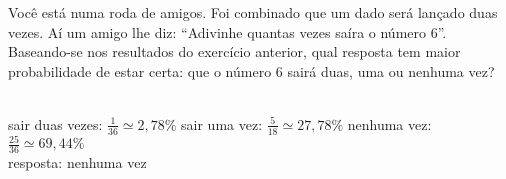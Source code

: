 \begin{ex}
Você está numa roda de amigos. Foi combinado que um dado será lançado duas vezes. Aí um amigo lhe diz: “Adivinhe quantas vezes saíra o número 6”.  Baseando-se nos resultados do exercício anterior, qual resposta tem maior probabilidade de estar certa: que o número 6 sairá duas, uma ou nenhuma vez?
 \begin{sol}
  \phantom{A} \\
  sair duas vezes: $\frac{1}{36}\simeq2,78\%$\hspace{0,4cm}
  sair uma vez: $\frac{5}{18}\simeq27,78\%$ \hspace{0,4cm}
  nenhuma vez: $\frac{25}{36}\simeq69,44\%$ \\
  resposta: nenhuma vez
  \end{sol}
\end{ex}